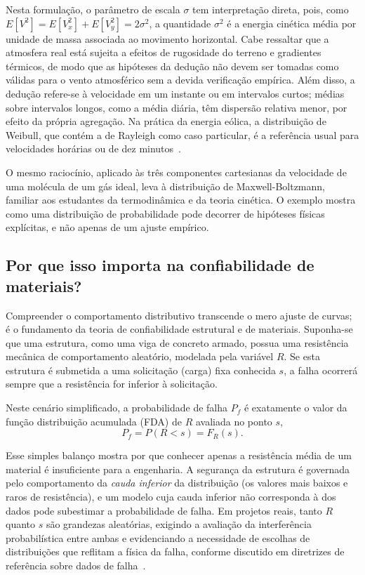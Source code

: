 Nesta formulação, o parâmetro de escala $\sigma$ tem interpretação direta, pois, como $E[V^2] = E[V_x^2] + E[V_y^2] = 2\sigma^2$, a quantidade $\sigma^2$ é a energia cinética média por unidade de massa associada ao movimento horizontal. Cabe ressaltar que a atmosfera real está sujeita a efeitos de rugosidade do terreno e gradientes térmicos, de modo que as hipóteses da dedução não devem ser tomadas como válidas para o vento atmosférico sem a devida verificação empírica. Além disso, a dedução refere-se à velocidade em um instante ou em intervalos curtos; médias sobre intervalos longos, como a média diária, têm dispersão relativa menor, por efeito da própria agregação. Na prática da energia eólica, a distribuição de Weibull, que contém a de Rayleigh como caso particular, é a referência usual para velocidades horárias ou de dez minutos~\cite{justus1978,carta2009}.

O mesmo raciocínio, aplicado às três componentes cartesianas da velocidade de uma molécula de um gás ideal, leva à distribuição de Maxwell-Boltzmann, familiar aos estudantes da termodinâmica e da teoria cinética. O exemplo mostra como uma distribuição de probabilidade pode decorrer de hipóteses físicas explícitas, e não apenas de um ajuste empírico.

\subsection{Por que isso importa na confiabilidade de materiais?}

Compreender o comportamento distributivo transcende o mero ajuste de curvas; é o fundamento da teoria de confiabilidade estrutural e de materiais. Suponha-se que uma estrutura, como uma viga de concreto armado, possua uma resistência mecânica de comportamento aleatório, modelada pela variável $R$. Se esta estrutura é submetida a uma solicitação (carga) fixa conhecida $s$, a falha ocorrerá sempre que a resistência for inferior à solicitação.

Neste cenário simplificado, a probabilidade de falha $P_f$ é exatamente o valor da função distribuição acumulada (FDA) de $R$ avaliada no ponto $s$,
\begin{equation}
    P_f = P(R < s) = F_R(s).
\end{equation}

Esse simples balanço mostra por que conhecer apenas a resistência média de um material é insuficiente para a engenharia. A segurança da estrutura é governada pelo comportamento da \textit{cauda inferior} da distribuição (os valores mais baixos e raros de resistência), e um modelo cuja cauda inferior não corresponda à dos dados pode subestimar a probabilidade de falha. Em projetos reais, tanto $R$ quanto $s$ são grandezas aleatórias, exigindo a avaliação da interferência probabilística entre ambas e evidenciando a necessidade de escolhas de distribuições que reflitam a física da falha, conforme discutido em diretrizes de referência sobre dados de falha~\cite{nist2012}.

